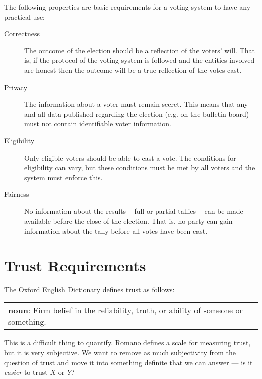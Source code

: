 The following properties are basic requirements for a voting system to have any practical use:

\begin{description}
    \item[Correctness] The outcome of the election should be a reflection of the voters' will. That is, if the protocol of the voting system is followed and the entities involved are honest then the outcome will be a true reflection of the votes cast.
    \item[Privacy] The information about a voter must remain secret. This means that any and all data published regarding the election (e.g. on the bulletin board) must not contain identifiable voter information.
    \item[Eligibility] Only eligible voters should be able to cast a vote. The conditions for eligibility can vary, but these conditions must be met by all voters and the system must enforce this.
    \item[Fairness] No information about the results -- full or partial tallies -- can be made available before the close of the election. That is, no party can gain information about the tally before all votes have been cast.
\end{description}







\section{Trust Requirements}
\label{ch:req:trust}

The Oxford English Dictionary defines trust as follows:

\vspace{1em}
\noindent \begin{tabular}{|p{}}
    \noindent \textbf{noun}: Firm belief in the reliability, truth, or ability of someone or something.
\end{tabular}
\vspace{1em}

This is a difficult thing to quantify. Romano \cite{romano_nature_2003} defines a scale for measuring trust, but it is very subjective. We want to remove as much subjectivity from the question of trust and move it into something definite that we can answer --- is it \emph{easier} to trust $X$ or $Y$?

